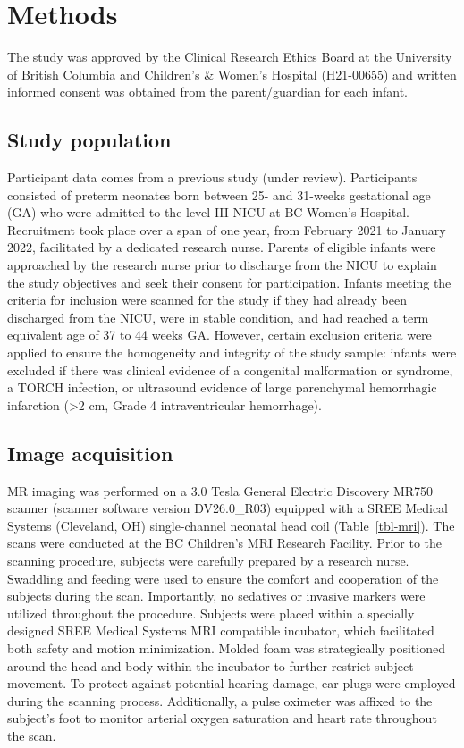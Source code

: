\documentclass[
true
]{sn-jnl}
\begin{document}
\section{Methods}\label{sec-data-methods}

The study was approved by the Clinical Research Ethics Board at the
University of British Columbia and Children's \& Women's Hospital
(H21-00655) and written informed consent was obtained from the
parent/guardian for each infant.

\subsection{Study population}\label{study-population}

Participant data comes from a previous study \citep{zhu-etal-cmro2}
(under review). Participants consisted of preterm neonates born between
25- and 31-weeks gestational age (GA) who were admitted to the level III
NICU at BC Women's Hospital. Recruitment took place over a span of one
year, from February 2021 to January 2022, facilitated by a dedicated
research nurse. Parents of eligible infants were approached by the
research nurse prior to discharge from the NICU to explain the study
objectives and seek their consent for participation. Infants meeting the
criteria for inclusion were scanned for the study if they had already
been discharged from the NICU, were in stable condition, and had reached
a term equivalent age of 37 to 44 weeks GA. However, certain exclusion
criteria were applied to ensure the homogeneity and integrity of the
study sample: infants were excluded if there was clinical evidence of a
congenital malformation or syndrome, a TORCH infection, or ultrasound
evidence of large parenchymal hemorrhagic infarction (\textgreater2 cm,
Grade 4 intraventricular hemorrhage).

\subsection{Image acquisition}\label{image-acquisition}

MR imaging was performed on a 3.0 Tesla General Electric Discovery MR750
scanner (scanner software version DV26.0\_R03) equipped with a SREE
Medical Systems (Cleveland, OH) single-channel neonatal head coil
(Table~\ref{tbl-mri}). The scans were conducted at the BC Children's MRI
Research Facility. Prior to the scanning procedure, subjects were
carefully prepared by a research nurse. Swaddling and feeding were used
to ensure the comfort and cooperation of the subjects during the scan.
Importantly, no sedatives or invasive markers were utilized throughout
the procedure. Subjects were placed within a specially designed SREE
Medical Systems MRI compatible incubator, which facilitated both safety
and motion minimization. Molded foam was strategically positioned around
the head and body within the incubator to further restrict subject
movement. To protect against potential hearing damage, ear plugs were
employed during the scanning process. Additionally, a pulse oximeter was
affixed to the subject's foot to monitor arterial oxygen saturation and
heart rate throughout the scan.
\end{document}
